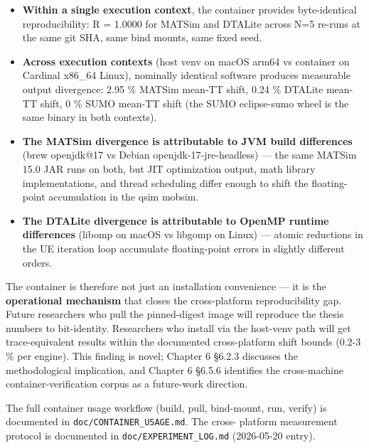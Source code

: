 \begin{itemize}
\tightlist
\item
  \textbf{Within a single execution context}, the container provides
  byte-identical reproducibility: R = 1.0000 for MATSim and DTALite
  across N=5 re-runs at the same git SHA, same bind mounts, same fixed
  seed.
\item
  \textbf{Across execution contexts} (host venv on macOS arm64 vs
  container on Cardinal x86\_64 Linux), nominally identical software
  produces measurable output divergence: 2.95 \% MATSim mean-TT shift,
  0.24 \% DTALite mean-TT shift, 0 \% SUMO mean-TT shift (the SUMO
  eclipse-sumo wheel is the same binary in both contexts).
\item
  \textbf{The MATSim divergence is attributable to JVM build
  differences} (brew openjdk@17 vs Debian openjdk-17-jre-headless) ---
  the same MATSim 15.0 JAR runs on both, but JIT optimization output,
  math library implementations, and thread scheduling differ enough to
  shift the floating-point accumulation in the qsim mobsim.
\item
  \textbf{The DTALite divergence is attributable to OpenMP runtime
  differences} (libomp on macOS vs libgomp on Linux) --- atomic
  reductions in the UE iteration loop accumulate floating-point errors
  in slightly different orders.
\end{itemize}

The container is therefore not just an installation convenience --- it
is the \textbf{operational mechanism} that closes the cross-platform
reproducibility gap. Future researchers who pull the pinned-digest image
will reproduce the thesis numbers to bit-identity. Researchers who
install via the host-venv path will get trace-equivalent results within
the documented cross-platform shift bounds (0.2-3 \% per engine). This
finding is novel; Chapter 6 §6.2.3 discusses the methodological
implication, and Chapter 6 §6.5.6 identifies the cross-machine
container-verification corpus as a future-work direction.

The full container usage workflow (build, pull, bind-mount, run, verify)
is documented in \texttt{doc/CONTAINER\_USAGE.md}. The cross- platform
measurement protocol is documented in \texttt{doc/EXPERIMENT\_LOG.md}
(2026-05-20 entry).
